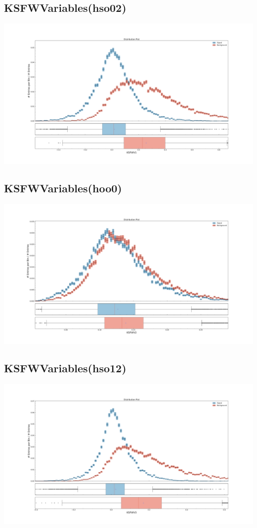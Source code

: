\documentclass[10pt,a4paper]{article}
\begin{document}
\subsection{KSFWVariables(hso02)}
\begin{center}
\includegraphics[width=1.0\textwidth]{variable_6489225247455682486.pdf}
\end{center}
\subsection{KSFWVariables(hoo0)}
\begin{center}
\includegraphics[width=1.0\textwidth]{variable_-267544587104425045.pdf}
\end{center}
\subsection{KSFWVariables(hso12)}
\begin{center}
\includegraphics[width=1.0\textwidth]{variable_4644993807343509309.pdf}
\end{center}
\end{document}
